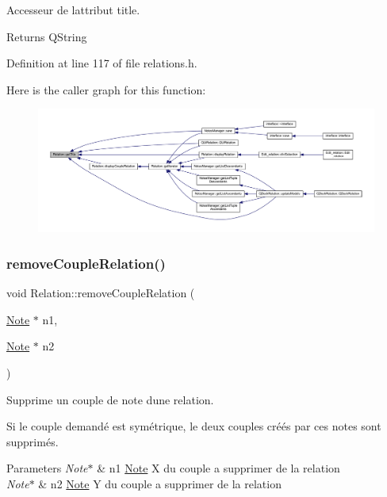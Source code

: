 Accesseur de l\textquotesingle{}attribut title. 

\begin{DoxyReturn}{Returns}
Q\+String 
\end{DoxyReturn}


Definition at line 117 of file relations.\+h.

Here is the caller graph for this function\+:\nopagebreak
\begin{figure}[H]
\begin{center}
\leavevmode
\includegraphics[width=350pt]{class_relation_aef1db31b9f1a2dc79a1688d4e466e2b1_icgraph}
\end{center}
\end{figure}
\mbox{\label{class_relation_ab81e16d688dcb4703e8ab299fef80c10}} 
\subsubsection{\texorpdfstring{remove\+Couple\+Relation()}{removeCoupleRelation()}}
{\footnotesize\ttfamily void Relation\+::remove\+Couple\+Relation (\begin{DoxyParamCaption}\item[{\hyperlink{class_note}{Note} $\ast$}]{n1,  }\item[{\hyperlink{class_note}{Note} $\ast$}]{n2 }\end{DoxyParamCaption})}



Supprime un couple de note d\textquotesingle{}une relation. 

Si le couple demandé est symétrique, le deux couples créés par ces notes sont supprimés. 
\begin{DoxyParams}{Parameters}
{\em Note$\ast$} & n1 \hyperlink{class_note}{Note} X du couple a supprimer de la relation \\
\hline
{\em Note$\ast$} & n2 \hyperlink{class_note}{Note} Y du couple a supprimer de la relation \\
\hline
\end{DoxyParams}


